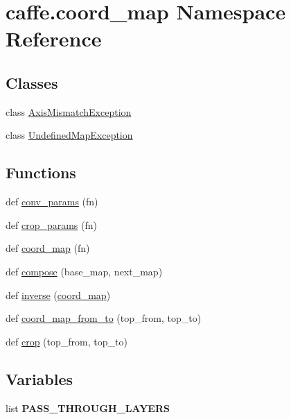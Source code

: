 \hypertarget{namespacecaffe_1_1coord__map}{}\section{caffe.\+coord\+\_\+map Namespace Reference}
\label{namespacecaffe_1_1coord__map}
\subsection*{Classes}
\begin{DoxyCompactItemize}
\item 
class \mbox{\hyperlink{classcaffe_1_1coord__map_1_1_axis_mismatch_exception}{Axis\+Mismatch\+Exception}}
\item 
class \mbox{\hyperlink{classcaffe_1_1coord__map_1_1_undefined_map_exception}{Undefined\+Map\+Exception}}
\end{DoxyCompactItemize}
\subsection*{Functions}
\begin{DoxyCompactItemize}
\item 
def \mbox{\hyperlink{namespacecaffe_1_1coord__map_a1683f31b74339c8ac4c4985132fdecfc}{conv\+\_\+params}} (fn)
\item 
def \mbox{\hyperlink{namespacecaffe_1_1coord__map_ac97591996ede7cfc368c2e472e0d07b6}{crop\+\_\+params}} (fn)
\item 
def \mbox{\hyperlink{namespacecaffe_1_1coord__map_a0f5ba2053a2fd10038360dea8b2e5b9b}{coord\+\_\+map}} (fn)
\item 
def \mbox{\hyperlink{namespacecaffe_1_1coord__map_a06830f75738dcbc0b29bfeb30ae4f990}{compose}} (base\+\_\+map, next\+\_\+map)
\item 
def \mbox{\hyperlink{namespacecaffe_1_1coord__map_ad03646b133a0a44eb1062c6acf677c8c}{inverse}} (\mbox{\hyperlink{namespacecaffe_1_1coord__map_a0f5ba2053a2fd10038360dea8b2e5b9b}{coord\+\_\+map}})
\item 
def \mbox{\hyperlink{namespacecaffe_1_1coord__map_abf9ba4c31e6e4f0bcd3130ea9001514b}{coord\+\_\+map\+\_\+from\+\_\+to}} (top\+\_\+from, top\+\_\+to)
\item 
def \mbox{\hyperlink{namespacecaffe_1_1coord__map_aca9f1366a027d686a27d150e054296ee}{crop}} (top\+\_\+from, top\+\_\+to)
\end{DoxyCompactItemize}
\subsection*{Variables}
\begin{DoxyCompactItemize}
\item 
list {\bfseries P\+A\+S\+S\+\_\+\+T\+H\+R\+O\+U\+G\+H\+\_\+\+L\+A\+Y\+E\+RS}
\end{DoxyCompactItemize}


